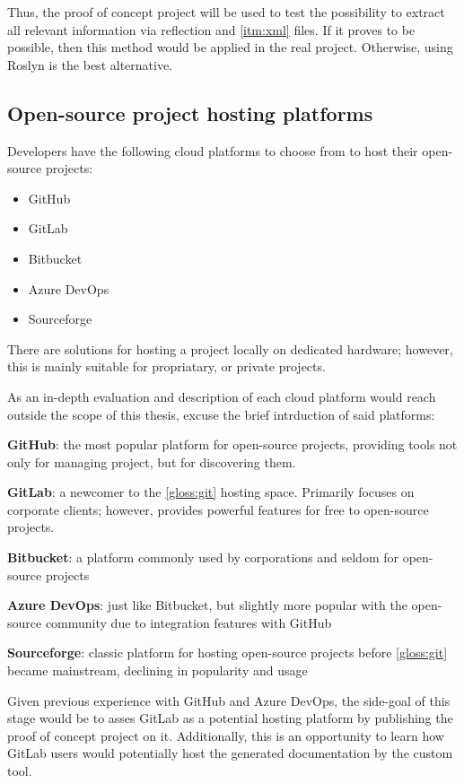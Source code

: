 Thus, the proof of concept project will be used to test the possibility to extract all relevant information via reflection and \ref{itm:xml} files. If it proves to be possible, then this method would be applied in the real project. Otherwise, using Roslyn is the best alternative.

\subsection{Open-source project hosting platforms}
Developers have the following cloud platforms to choose from to host their open-source projects:
\begin{itemize}
    \item GitHub
    \item GitLab
    \item Bitbucket
    \item Azure DevOps
    \item Sourceforge
\end{itemize}

There are solutions for hosting a project locally on dedicated hardware; however, this is mainly suitable for propriatary, or private projects.

As an in-depth evaluation and description of each cloud platform would reach outside the scope of this thesis, excuse the brief intrduction of said platforms:

\textbf{GitHub}: the most popular platform for open-source projects, providing tools not only for managing project, but for discovering them.

\textbf{GitLab}: a newcomer to the \ref{gloss:git} hosting space. Primarily focuses on corporate clients; however, provides powerful features for free to open-source projects.

\textbf{Bitbucket}: a platform commonly used by corporations and seldom for open-source projects

\textbf{Azure DevOps}: just like Bitbucket, but slightly more popular with the open-source community due to integration features with GitHub

\textbf{Sourceforge}: classic platform for hosting open-source projects before \ref{gloss:git} became mainstream, declining in popularity and usage

Given previous experience with GitHub and Azure DevOps, the side-goal of this stage would be to asses GitLab as a potential hosting platform by publishing the proof of concept project on it. Additionally, this is an opportunity to learn how GitLab users would potentially host the generated documentation by the custom tool.

